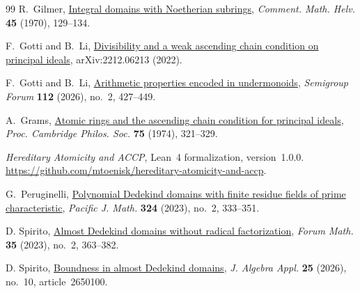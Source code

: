 \documentclass{article}
\theoremstyle{remark}
\begin{document}
\begin{thebibliography}{99}
    R.~Gilmer, \href{https://doi.org/10.1007/BF02567320}{Integral domains with Noetherian subrings},
    \emph{Comment. Math. Helv.} \textbf{45} (1970), 129--134.

    F.~Gotti and B.~Li, \href{https://arxiv.org/abs/2212.06213}{Divisibility and a weak ascending chain condition on principal ideals},
    arXiv:2212.06213 (2022).

    F.~Gotti and B.~Li, \href{https://doi.org/10.1007/s00233-025-10578-3}{Arithmetic properties encoded in undermonoids},
    \emph{Semigroup Forum} \textbf{112} (2026), no.~2, 427--449.

    A.~Grams, \href{https://doi.org/10.1017/S0305004100048532}{Atomic rings and the ascending chain condition for principal ideals},
    \emph{Proc. Cambridge Philos. Soc.} \textbf{75} (1974), 321--329.

    \emph{Hereditary Atomicity and ACCP}, Lean~4 formalization, version~1.0.0.\newline
    \url{https://github.com/mtoenisk/hereditary-atomicity-and-accp}.

    G.~Peruginelli, \href{https://doi.org/10.2140/pjm.2023.324.333}{Polynomial Dedekind domains with finite residue fields of prime characteristic},
    \emph{Pacific J. Math.} \textbf{324} (2023), no.~2, 333--351.

    D. Spirito, \href{https://doi.org/10.1515/forum-2022-0033}{Almost Dedekind domains without radical factorization},
    \emph{Forum Math.} \textbf{35} (2023), no.~2, 363--382.

    D. Spirito, \href{https://doi.org/10.1142/S0219498826501008}{Boundness in almost Dedekind domains},
    \emph{J. Algebra Appl.} \textbf{25} (2026), no.~10, article~2650100.
\end{thebibliography}
\end{document}
